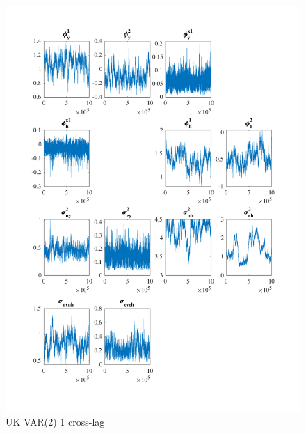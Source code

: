 \documentclass[
  12pt,
]{article}
\begin{document}
\begin{figure}

{\centering \includegraphics[width=0.85\linewidth]{../../Regression/Bayesian_UC_VAR2_nodrift_Crosscycle1lag/OutputData/posteriorchain_GB} 

}

\caption{UK VAR(2) 1 cross-lag}\label{fig:unnamed-chunk-16}
\end{figure}
\end{document}
